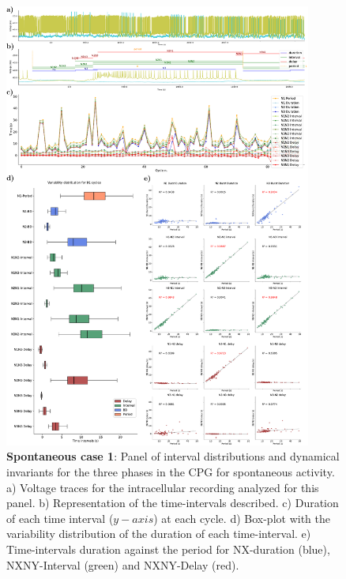 \begin{figure}[htbp]
	\centering
	\includegraphics[width=0.9\textwidth]{./img/invariants/data/SUSSEX/prep2/images/3phases/panel_with_intervals.pdf}
	\caption{\textbf{Spontaneous case 1}: Panel of interval distributions and dynamical invariants for the three phases in the CPG for spontaneous activity. a) Voltage traces for the intracellular recording analyzed for this panel. b) Representation of the time-intervals described. c) Duration of each time interval ($y-axis$) at each cycle. d) Box-plot with the variability distribution of the duration of each time-interval. e) Time-intervals duration against the period for NX-duration (blue), NXNY-Interval (green) and NXNY-Delay (red).}
	\label{fig:prep2 invariants}
\end{figure}

